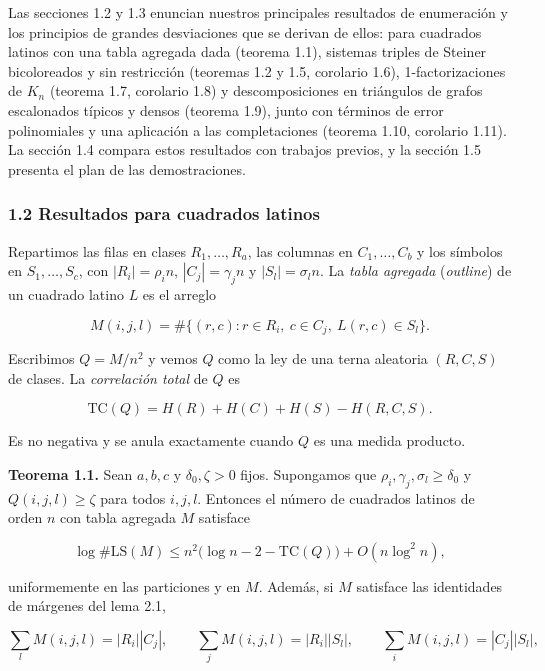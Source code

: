 \documentclass[spanish,11pt,a4paper]{article}
\begin{document}
Las secciones 1.2 y 1.3 enuncian nuestros principales resultados de enumeración y los principios de grandes desviaciones que se derivan de ellos: para cuadrados latinos con una tabla agregada dada (teorema 1.1), sistemas triples de Steiner bicoloreados y sin restricción (teoremas 1.2 y 1.5, corolario 1.6), 1-factorizaciones de \(K_n\) (teorema 1.7, corolario 1.8) y descomposiciones en triángulos de grafos escalonados típicos y densos (teorema 1.9), junto con términos de error polinomiales y una aplicación a las completaciones (teorema 1.10, corolario 1.11). La sección 1.4 compara estos resultados con trabajos previos, y la sección 1.5 presenta el plan de las demostraciones.

\subsubsection{1.2 Resultados para cuadrados latinos}\label{resultados-para-cuadrados-latinos}

Repartimos las filas en clases \(R_1,\dots,R_a\), las columnas en \(C_1,\dots,C_b\) y los símbolos en \(S_1,\dots,S_c\), con \(|R_i|=\rho_i n\), \(|C_j|=\gamma_j n\) y \(|S_l|=\sigma_l n\). La \emph{tabla agregada} (\emph{outline}) de un cuadrado latino \(L\) es el arreglo

\nopagebreak[4]
\[M(i,j,l)=\#\{(r,c): r\in R_i,\ c\in C_j,\ L(r,c)\in S_l\}.\]

Escribimos \(Q=M/n^2\) y vemos \(Q\) como la ley de una terna aleatoria \((R,C,S)\) de clases. La \emph{correlación total} de \(Q\) es

\nopagebreak[4]
\[\mathrm{TC}(Q)=H(R)+H(C)+H(S)-H(R,C,S).\]

Es no negativa y se anula exactamente cuando \(Q\) es una medida producto.

\textbf{Teorema 1.1.} Sean \(a,b,c\) y \(\delta_0,\zeta>0\) fijos. Supongamos que \(\rho_i,\gamma_j,\sigma_l\ge\delta_0\) y \(Q(i,j,l)\ge\zeta\) para todos \(i,j,l\). Entonces el número de cuadrados latinos de orden \(n\) con tabla agregada \(M\) satisface

\nopagebreak[4]
\[\log\#\mathrm{LS}(M)\le n^2\bigl(\log n-2-\mathrm{TC}(Q)\bigr)+O(n\log^2 n),\tag{1.1}\]

uniformemente en las particiones y en \(M\). Además, si \(M\) satisface las identidades de márgenes del lema 2.1,

\nopagebreak[4]
\[\sum_l M(i,j,l)=|R_i||C_j|,\qquad \sum_j M(i,j,l)=|R_i||S_l|,\qquad \sum_i M(i,j,l)=|C_j||S_l|,\]
\end{document}
